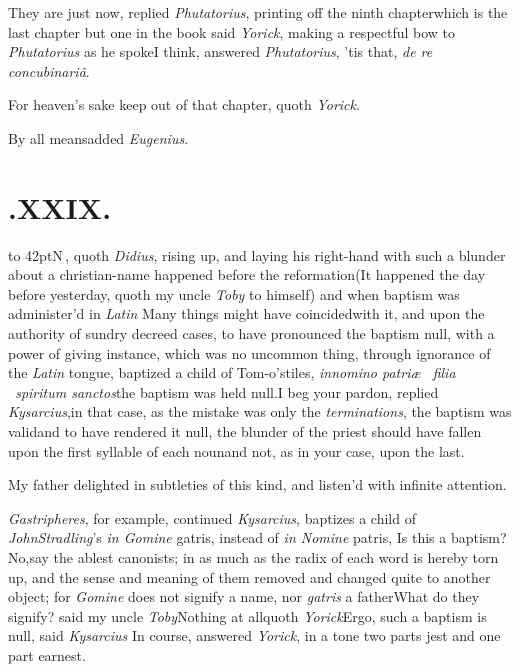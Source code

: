 \documentclass{article}
\begin{document}
They are just now, replied \textit{Phutatorius}, printing off the
ninth chapter\tsk which is the last chapter but one in the
book\tsk{} said
\textit{Yorick}, making a respectful bow to \textit{Phutatorius} as he
spoke\tsk I think, answered \textit{Phutatorius},
’tis that, \textit{de re concubinariâ}.

\newpage
For heaven’s sake keep out of that chapter, quoth
\textit{Yorick}.

\tsh By all means\tsk added \textit{Eugenius}.

\bigskip
\section{.\enspace XXIX.}

\lettrine{\hskip-3pt\hbox to 42pt{\Tsk N}}{\,}, quoth \textit{Didius},
rising up, and laying his right-hand with 
such a blunder about a christian-name
happened before the reformation\tsk (It happened the day
before yesterday, quoth my uncle \textit{Toby} to himself) and
when baptism was administer’d in
\textit{Latin}\tsh\break
{}\break
\tsk Many things might have coincided\break with it, and
upon the authority of sundry decreed cases, to have pronounced the
baptism null, with a power of giving\pb 
{}
instance, which was no uncommon thing, through
ignorance of the \textit{Latin} tongue, baptized a child of
Tom-o’stiles, \textit{in\break nomino patriæ \et\ filia \et\
spiritum sanctos}\break\tsk the baptism was held
null.\tsk I beg your pardon, replied
\textit{Kysarcius},\tsk in that case, as the mistake was only
the \textit{terminations}, the baptism was valid\tsh and to
have rendered it null, the blunder of the priest should have fallen
upon the first syllable of each noun\tsh and not, as in
your case, upon the last.\tsk

My father delighted in subtleties of this kind, and
listen’d with infinite attention.

\textit{Gastripheres}, for example, continued \textit{Kysarcius},
baptizes a child of \textit{John\break Stradling}’s \textit{in Gomine}
gatris, \etc \etc\pb instead of \textit{in Nomine} patris,
\etc\tsk Is this a baptism? No,\tsk say the ablest
canonists; in as much as the radix of each word is hereby torn up,
and the sense and meaning of them removed and changed quite to
another object; for \textit{Gomine} does not signify a name, nor
\textit{gatris} a father\tsk What do they signify? said my uncle
\textit{Toby}\tsk Nothing at all\tsh quoth
\textit{Yorick}\tsh Ergo, such a baptism is null, said
\textit{Kysarcius}\tsh
In course, answered \textit{Yorick}, in a tone two parts jest and
one\break
part earnest.\tsh
\end{document}
